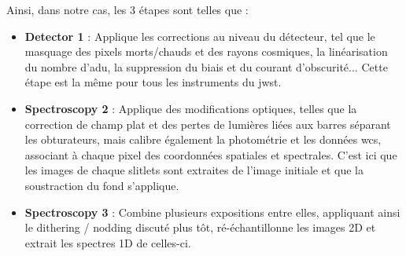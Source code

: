 \documentclass[11pt, a4paper]{article}
\begin{document}
Ainsi, dans notre cas, les 3 étapes sont telles que :\\


\begin{minipage}{.45\linewidth}
  \begin{itemize}[left=0cm]
    \item \textbf{Detector 1} : Applique les corrections au niveau du détecteur, tel que le masquage des pixels morts/chauds et des rayons cosmiques, la linéarisation du nombre d'\gls{adu}, la suppression du biais et du courant d'obscurité... Cette étape est la même pour tous les instruments du \gls{jwst}.
    \item \textbf{Spectroscopy 2} : Applique des modifications optiques, telles que la correction de champ plat et des pertes de lumières liées aux barres séparant les obturateurs, mais calibre également la photométrie et les données \gls{wcs}, associant à chaque pixel des coordonnées spatiales et spectrales. C'est ici que les images de chaque slitlets sont extraites de l'image initiale et que la soustraction du fond s'applique.
    \item \textbf{Spectroscopy 3} : Combine plusieurs expositions entre elles, appliquant ainsi le dithering / nodding discuté plus tôt, ré-échantillonne les images 2D et extrait les spectres 1D de celles-ci.
  \end{itemize}
  \end{minipage}
  \hfill
\end{document}
